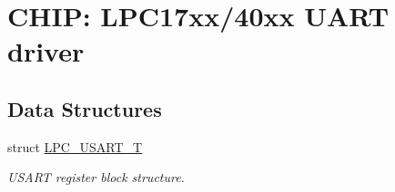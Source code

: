 \hypertarget{group__UART__17XX__40XX}{\section{C\-H\-I\-P\-: L\-P\-C17xx/40xx U\-A\-R\-T driver}
\label{group__UART__17XX__40XX}
}
\subsection*{Data Structures}
\begin{DoxyCompactItemize}
\item 
struct \hyperlink{structLPC__USART__T}{L\-P\-C\-\_\-\-U\-S\-A\-R\-T\-\_\-\-T}
\begin{DoxyCompactList}\small\item\em U\-S\-A\-R\-T register block structure. \end{DoxyCompactList}\end{DoxyCompactItemize}
